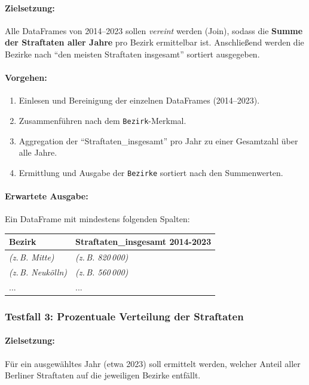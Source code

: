 \documentclass[11pt,a4paper]{article}
\begin{document}
\paragraph{Zielsetzung:}
Alle DataFrames von 2014--2023 sollen \emph{vereint} werden (Join), sodass die \textbf{Summe der Straftaten aller Jahre} pro Bezirk ermittelbar ist. Anschließend werden die Bezirke nach \enquote{den meisten Straftaten insgesamt} sortiert ausgegeben.

\paragraph{Vorgehen:}
\begin{enumerate}
    \item Einlesen und Bereinigung der einzelnen DataFrames (2014--2023).
    \item Zusammenführen nach dem \texttt{Bezirk}-Merkmal.
    \item Aggregation der \enquote{Straftaten\_insgesamt} pro Jahr zu einer Gesamtzahl über alle Jahre.
    \item Ermittlung und Ausgabe der \texttt{Bezirke} sortiert nach den Summenwerten.
\end{enumerate}

\paragraph{Erwartete Ausgabe:}
Ein DataFrame mit mindestens folgenden Spalten:
\begin{center}
    \begin{tabular}{|l|l|}
        \hline
        \textbf{Bezirk} & \textbf{Straftaten\_insgesamt 2014-2023} \\
        \hline
        \textit{(z.\,B. Mitte)} & \textit{(z.\,B. 820\,000)} \\
        \textit{(z.\,B. Neukölln)} & \textit{(z.\,B. 560\,000)} \\
        ... & ...\\
        \hline
    \end{tabular}
\end{center}

\subsubsection{Testfall 3: Prozentuale Verteilung der Straftaten}
\paragraph{Zielsetzung:}
Für ein ausgewähltes Jahr (etwa 2023) soll ermittelt werden, welcher Anteil aller Berliner Straftaten auf die jeweiligen Bezirke entfällt.
\end{document}
